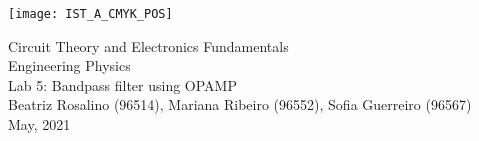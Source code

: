 
\thispagestyle {empty}

\texttt{[image: IST\_A\_CMYK\_POS]}

\begin{center}
%
\vspace{1.0cm}

\vspace{1cm}
{\FontLb Circuit Theory and Electronics Fundamentals} \\ %
\vspace{1cm}
{\FontSn Engineering Physics} \\ %
\vspace{1cm}
{\FontSn Lab 5: Bandpass filter using OPAMP} \\
\vspace{1cm}
{\FontSn Beatriz Rosalino (96514), Mariana Ribeiro (96552), Sofia Guerreiro (96567)} \\
\vspace{1cm}
{ May, 2021} \\ %
%
\end{center}

